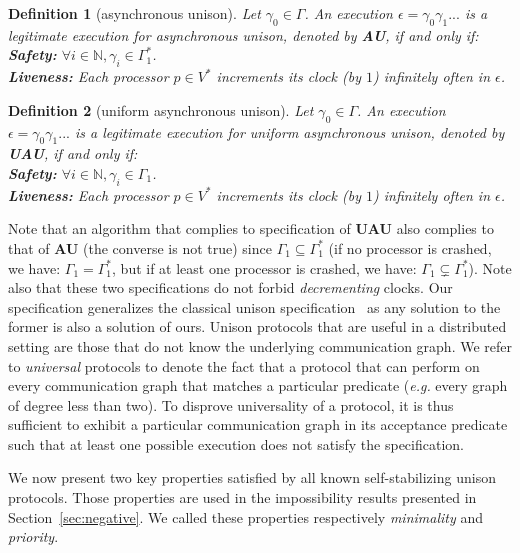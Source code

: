 \documentclass[11pt,english,letterpaper]{article}
\newtheorem{definition}{Definition}
\begin{document}
\begin{definition}[asynchronous unison]
Let $\gamma_{0} \in \Gamma$. An execution $\epsilon=\gamma_{0}\gamma_{1}...$ is a legitimate execution for asynchronous unison, denoted by \textbf{AU}, if and only if:\\
\indent \textbf{Safety:} $\forall i\in\mathbb{N},\gamma_{i}\in\Gamma_{1}^{*}$.\\
\indent \textbf{Liveness:} Each processor $p\in V^{*}$ increments its clock (by $1$) infinitely often in $\epsilon$.
\end{definition}
	
\begin{definition}[uniform asynchronous unison]
Let $\gamma_{0} \in \Gamma$. An execution $\epsilon=\gamma_{0}\gamma_{1}...$ is a legitimate execution for uniform asynchronous unison, denoted by \textbf{UAU}, if and only if:\\
\indent \textbf{Safety:} $\forall i\in\mathbb{N},\gamma_{i}\in\Gamma_{1}$.\\
\indent \textbf{Liveness:} Each processor $p\in V^{*}$ increments its clock (by $1$) infinitely often in $\epsilon$.
\end{definition}

Note that an algorithm that complies to specification of \textbf{UAU} also complies to that of \textbf{AU} (the converse is not true) since $\Gamma_{1}\subseteq\Gamma_{1}^{*}$ (if no processor is crashed, we have: $\Gamma_{1}=\Gamma_{1}^{*}$, but if at least one processor is crashed, we have: $\Gamma_{1}\subsetneq \Gamma_{1}^{*}$). Note also that these two specifications do not forbid \emph{decrementing} clocks. Our specification generalizes the classical unison specification~\cite{CFG92c} as any solution to the former is also a solution of ours. Unison protocols that are useful in a distributed setting are those that do not know the underlying communication graph. We refer to \emph{universal} protocols to denote the fact that a protocol that can perform on every communication graph that matches a particular predicate (\emph{e.g.} every graph of degree less than two). To disprove universality of a protocol, it is thus sufficient to exhibit a particular communication graph in its acceptance predicate such that at least one possible execution does not satisfy the specification.

We now present two key properties satisfied by all known self-stabilizing unison protocols. Those properties are used in the impossibility results presented in Section~\ref{sec:negative}. We called these properties respectively \emph{minimality} and \emph{priority}.
\end{document}
